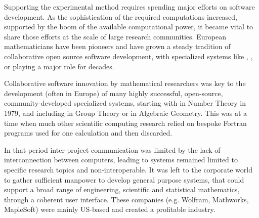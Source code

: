 
Supporting the experimental method requires spending major efforts
on software development. As the sophistication of the required
computations increased, supported by the boom of the available
computational power, it became vital to share those efforts at the
scale of large research communities. European mathematicians have been
pioneers and have grown a steady tradition of collaborative open
source software development, with specialized systems like \GAP,
\Singular, or \PariGP playing a major role for decades.


Collaborative software innovation by mathematical researchers was key
to the development (often in Europe) of many highly successful,
open-source, community-developed specialized systems, starting with
\PariGP in Number Theory in 1979, and including \GAP in Group Theory
or \Singular in Algebraic Geometry. This was at a time when much other
scientific computing research relied on bespoke Fortran programs used
for one calculation and then discarded.



In that period inter-project communication was limited by the lack of
interconnection between computers, leading to systems remained limited
to specific research topics and non-interoperable. It was left to the
corporate world to gather sufficient manpower to develop general
purpose systems, that could support a broad range of engineering,
scientific and statistical mathematics, through a coherent user
interface. These companies (e.g. Wolfram, Mathworks, MapleSoft) were
mainly US-based and created a profitable industry.


